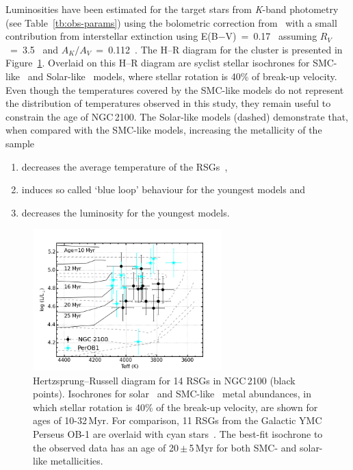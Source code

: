 Luminosities have been estimated for the target stars from {\it K}-band photometry (see Table~\ref{tb:obs-params}) using the bolometric correction from~\cite{2013ApJ...767....3D} with a small contribution from interstellar extinction using E(B$-$V)~=~0.17~\citep{2015A&A...575A..62N} assuming $R_V$~=~3.5~\citep{2013A&A...558A.134D} and $A_K/A_V$~=~0.112~\citep{1985ApJ...288..618R}.
The H--R diagram for the cluster is presented in Figure~\ref{fig:HRD}.
Overlaid on this H--R diagram are {\sc syclist} stellar isochrones for SMC-like~\citep[solid lines;][]{2013A&A...558A.103G} and Solar-like~\citep[dashed lines;][]{2012A&A...537A.146E} models, where stellar rotation is 40\% of break-up velocity.
Even though the temperatures covered by the SMC-like models do not represent the distribution of temperatures observed in this study, they remain useful to constrain the age of NGC\,2100.
The Solar-like models (dashed) demonstrate that, when compared with the SMC-like models, increasing the metallicity of the sample
\begin{enumerate}
\item decreases the average temperature of the RSGs~\citep[something which is not observed by][see Chapter~\ref{ch:ngc6822}]{2015ApJ...803...14P},
\item induces so called `blue loop' behaviour for the youngest models and
\item decreases the luminosity for the youngest models.
\end{enumerate}

\begin{figure}
\centering
 \includegraphics[width=0.65\textwidth]{ngc2100/NGC2100-HRD-perOB1}
 \caption[NGC\,2100 Hertzsprung--Russell diagram for RSGs]{Hertzsprung--Russell diagram for 14 RSGs in NGC\,2100 (black points).
  Isochrones for solar~\citep[dashed grey lines;][]{2012A&A...537A.146E} and SMC-like~\citep[solid black lines;][]{2013A&A...558A.103G} metal abundances,
  in which stellar rotation is 40\% of the break-up velocity, are shown for ages of 10-32\,Myr. For comparison, 11 RSGs from the Galactic YMC Perseus OB-1 are overlaid with cyan stars~\citep{2014ApJ...788...58G}.
  The best-fit isochrone to the observed data has an age of 20\,$\pm$\,5\,Myr for both SMC- and solar-like metallicities.
  \label{fig:HRD}
          }
\end{figure}

